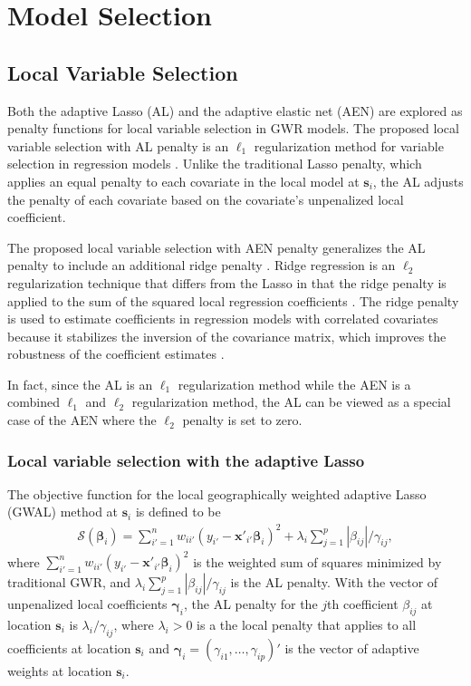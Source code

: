 \documentclass[authoryear, review, 11pt]{elsarticle}
\begin{document}
	
	 
	
\section{Model Selection \label{section:model-selection}}
	\subsection{Local Variable Selection}
	Both the adaptive Lasso (AL) and the adaptive elastic net (AEN) are explored as penalty functions for local variable selection in GWR models. 	
	The proposed local variable selection with AL penalty is an $\ell_1$ regularization method for variable selection in regression models \citep{Zou:2006}. Unlike the traditional Lasso penalty, which applies an equal penalty to each covariate in the local model at $\bm{s}_i$, the AL adjusts the penalty of each covariate based on the covariate's unpenalized local coefficient.	
	
	The proposed local variable selection with AEN penalty generalizes the AL penalty to include an additional ridge penalty \citep{Zou:2009}. Ridge regression is an $\ell_2$ regularization technique that differs from the Lasso in that the ridge penalty is applied to the sum of the squared local regression coefficients \citep{Hoerl:1970}. The ridge penalty is used to estimate coefficients in regression models with correlated covariates because it stabilizes the inversion of the covariance matrix, which improves the robustness of the coefficient estimates \citep{Hastie:2009}.
	
	In fact, since the AL is an $\ell_1$ regularization method while the AEN is a combined $\ell_1$ and $\ell_2$ regularization method, the AL can be viewed as a special case of the AEN where the $\ell_2$ penalty is set to zero.
	
	\subsubsection{Local variable selection with the adaptive Lasso}
	The objective function for the local geographically weighted adaptive Lasso (GWAL) method at $\bm{s}_i$ is defined to be
	\begin{align}\label{eq:adaptive-lasso-WLS}
		\mathcal{S}(\bm{\beta}_i) = \sum_{i'=1}^n w_{ii'} \left(y_{i'} - \bm{x}'_{i'} \bm{\beta}_i \right)^2 +  \lambda_i \sum_{j=1}^p |\beta_{ij}| / \gamma_{ij},
	\end{align}
	where $\sum_{i'=1}^n w_{ii'} \left(y_{i'} - \bm{x}'_{i'} \bm{\beta}_i \right)^2$ is the weighted sum of squares minimized by traditional GWR, and $\lambda_i \sum_{j=1}^p |\beta_{ij}| / \gamma_{ij}$ is the AL penalty. With the vector of unpenalized local coefficients $\bm{\gamma}_i$, the AL penalty for the $j$th coefficient $\beta_{ij}$ at location $\bm{s}_i$ is $\lambda_i / \gamma_{ij}$, where $\lambda_i > 0$ is a the local penalty that applies to all coefficients at location $\bm{s}_i$ and $\bm{\gamma}_i = \left(\gamma_{i1}, \dots, \gamma_{ip}\right)'$ is the vector of adaptive weights at location $\bm{s}_i$.
	
\end{document}
